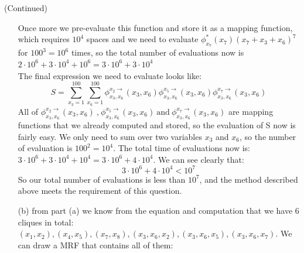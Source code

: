 \documentclass[11pt]{article}
\newcommand{\nodesize}{1.3}
\begin{document}
\begin{answertext}{20cm}{}
(Continued)
\begin{enumerate}
\item[]Once more we pre-evaluate this function and store it as a mapping function, which requires $10^4$ spaces and we need to evaluate $\phi^*_{x_7}(x_7) (x_7 + x_3 + x_6)^7$ for $100^3=10^6$ times, so the total number of evaluations now is $2\cdot 10^6 + 3\cdot 10^4 + 10^6= 3\cdot 10^6 + 3\cdot 10^4$\\
The final expression we need to evaluate looks like:
$$S = \sum^{100}_{x_3 = 1}\sum^{100}_{x_6 = 1}\phi^{x_2\rightarrow}_{x_3,x_6}(x_3,x_6) \phi^{x_5\rightarrow}_{x_3,x_6}(x_3,x_6) \phi^{x_7\rightarrow}_{x_3,x_6}(x_3,x_6)$$
All of $\phi^{x_2\rightarrow}_{x_3,x_6}(x_3,x_6) \ \text{,}\ \phi^{x_5\rightarrow}_{x_3,x_6}(x_3,x_6)\ \text{and} \ \phi^{x_7\rightarrow}_{x_3,x_6}(x_3,x_6)$ are mapping functions that we already computed and stored, so the evaluation of S now is fairly easy. We only need to sum over two variables $x_3$ and $x_6$, so the number of evaluation is $100^2 = 10^4$. The total time of evaluations now is: $3\cdot 10^6 + 3\cdot 10^4 + 10^4 = 3\cdot 10^6 + 4\cdot 10^4$. We can see clearly that:
$$3\cdot 10^6 + 4\cdot 10^4 < 10^7$$
So our total number of evaluations is less than $10^7$, and the method described above meets the requirement of this question.\\
\item[(b)] from part (a) we know from the equation and computation that we have 6 cliques in total: $(x_1, x_2),(x_4, x_5),(x_7, x_8),(x_3, x_6, x_2),(x_3, x_6, x_5),(x_3, x_6, x_7)$. We can draw a MRF that contains all of them:
\begin{center}
\end{center}
\end{enumerate}
\end{answertext}
\end{document}

